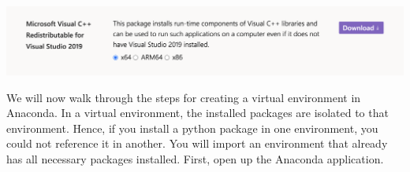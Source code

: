 \documentclass[11 pt]{article}
\begin{document}
\begin{center}
\includegraphics[scale=0.4]{vs_download}
\end{center}

We will now walk through the steps for creating a virtual environment in Anaconda. In a virtual environment, the installed packages are isolated to that environment. Hence, if you install a python package in one environment, you could not reference it in another. You will import an environment that already has all necessary packages installed. First, open up the Anaconda application.
\end{document}
